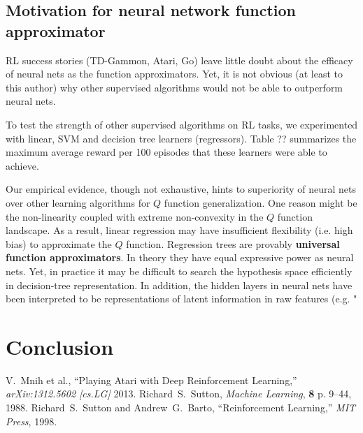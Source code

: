\documentclass[conference]{IEEEtran}
\begin{document}
\subsection{Motivation for neural network function approximator}
RL success stories (TD-Gammon, Atari, Go) leave little doubt about the efficacy of neural nets as the function approximators. Yet, it is not obvious (at least to this author) why other supervised algorithms would not be able to outperform neural nets. 

To test the strength of other supervised algorithms on RL tasks, we experimented with linear, SVM and decision tree learners (regressors). Table ?? summarizes the maximum average reward per 100 episodes that these learners were able to achieve. 

Our empirical evidence, though not exhaustive, hints to superiority of neural nets over other learning algorithms for $Q$ function generalization. One reason might be the non-linearity coupled with extreme non-convexity in the $Q$ function landscape. As a result, linear regression may have insufficient flexibility (i.e. high bias) to approximate the $Q$ function. Regression trees are provably {\bf universal function approximators}. In theory they have equal expressive power as neural nets. Yet, in practice it may be difficult to search the hypothesis space efficiently in decision-tree representation. In addition, the hidden layers in neural nets have been interpreted to be representations of latent information in raw features (e.g. "
\section*{Conclusion}
 
\begin{thebibliography}{1}
V.~Mnih et al., ``Playing Atari with Deep Reinforcement Learning,'' {\em arXiv:1312.5602 [cs.LG]} 2013.
Richard~S.~Sutton, {\em Machine Learning}, {\bf 8} p. 9--44, 1988.
Richard~S.~Sutton and Andrew~G.~Barto, ``Reinforcement Learning,'' {\em MIT Press}, 1998.
\end{thebibliography}
\end{document}
